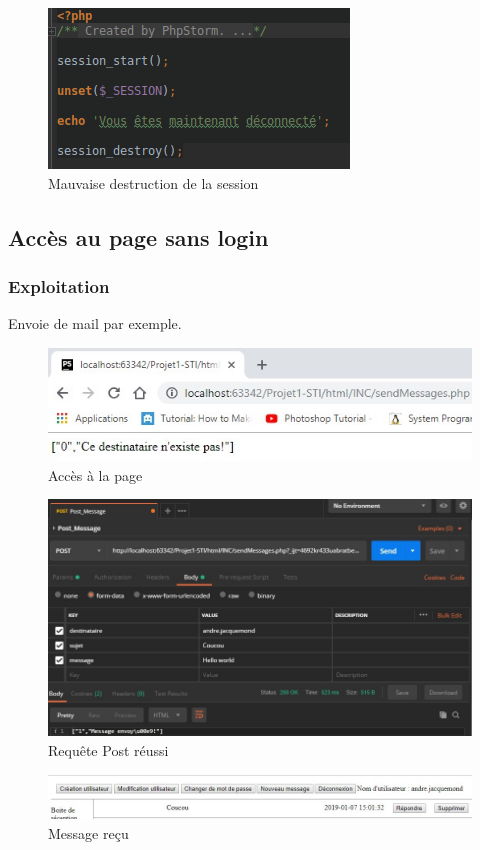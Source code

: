 \documentclass[12pt]{article}
\begin{document}
\begin{figure}[H]
\centering
\includegraphics[width=\linewidth]{images/sessionDestroy.png}
\caption{Mauvaise destruction de la session}
\end{figure}

\subsection{Accès au page sans login}
\subsubsection{Exploitation}
Envoie de mail par exemple.
\begin{figure}[H]
\centering
\includegraphics{images/withoutLogin.jpg}
\caption{Accès à la page}
\end{figure}
\begin{figure}[H]
\centering
\includegraphics[width=\linewidth]{images/postmanSendMessage.jpg}
\caption{Requête Post réussi}
\end{figure}
\begin{figure}[H]
\centering
\includegraphics[width=\linewidth]{images/postmanSendMessageSuccess.jpg}
\caption{Message reçu}
\end{figure}
\end{document}
